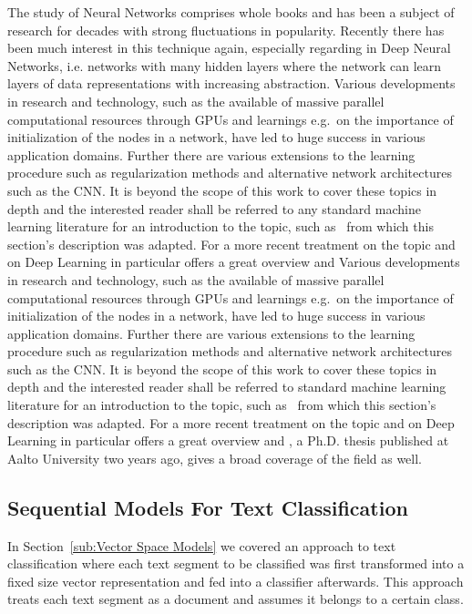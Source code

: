 The study of Neural Networks comprises whole books and has been a subject of research for decades with strong fluctuations in popularity.
Recently there has been much interest in this technique again, especially regarding in Deep Neural Networks, i.e. networks with many hidden layers where the network can learn layers of data representations with increasing abstraction.
Various developments in research and technology, such as the available of massive parallel computational resources through \glspl{GPU} and learnings e.g.\ on the importance of initialization of the nodes in a network, have led to huge success in various application domains. Further there are various extensions to the learning procedure such as regularization methods and alternative network architectures such as the \gls{CNN}. It is beyond the scope of this work to cover these topics in depth and the interested reader shall be referred to any standard machine learning literature for an introduction to the topic, such as~\cite{Bishop:2006aa} from which this section's description was adapted. For a more recent treatment on the topic and on \gls{Deep Learning} in particular \cite{Bengio:2015aa} offers a great overview and  \cite{Cho:2014aa}
Various developments in research and technology, such as the available of massive parallel computational resources through \glspl{GPU} and learnings e.g.\ on the importance of initialization of the nodes in a network, have led to huge success in various application domains. Further there are various extensions to the learning procedure such as regularization methods and alternative network architectures such as the \gls{CNN}. It is beyond the scope of this work to cover these topics in depth and the interested reader shall be referred to standard machine learning literature for an introduction to the topic, such as~\cite{Bishop:2006aa} from which this section's description was adapted. For a more recent treatment on the topic and on \gls{Deep Learning} in particular \cite{Bengio:2015aa} offers a great overview and \cite{Cho:2014aa}, a Ph.D. thesis published at Aalto University two years ago, gives a broad coverage of the field as well.

\subsection{Sequential Models For Text Classification}
\label{sub:Sequential Models For Text Classification}

In Section~\ref{sub:Vector Space Models} we covered an approach to text classification where each text segment to be classified was first transformed into a fixed size vector representation and fed into a classifier afterwards. This approach treats each text segment as a document and assumes it belongs to a certain class.

